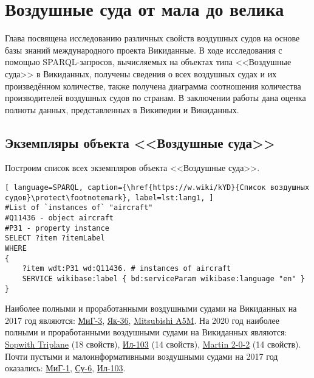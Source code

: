 \chapter{Воздушные суда от мала до велика}%
\label{ch:aircraft-chapter}

Глава посвящена исследованию различных свойств воздушных судов 
на основе базы знаний международного проекта Викиданные. 
В ходе исследования с помощью SPARQL-запросов, вычисляемых на объектах типа <<Воздушные суда>> в Викиданных, 
получены сведения о всех воздушных судах и их произведённом количестве, 
также получена диаграмма соотношения количества производителей воздушных судов по странам. 
В заключении работы дана оценка полноты данных, представленных в Википедии и Викиданных.

\section{Экземпляры объекта <<Воздушные суда>>}

Построим список всех экземпляров объекта <<Воздушные суда>>.


\begin{lstlisting}[ language=SPARQL, caption={\href{https://w.wiki/kYD}{Список воздушных судов}\protect\footnotemark}, label=lst:lang1, ]
#List of `instances of` "aircraft"
#Q11436 - object aircraft
#P31 - property instance
SELECT ?item ?itemLabel
WHERE
{
    ?item wdt:P31 wd:Q11436. # instances of aircraft
    SERVICE wikibase:label { bd:serviceParam wikibase:language "en" }
}
\end{lstlisting}


Наиболее полными и проработанными воздушными судами на Викиданных на 2017 год являются: \href{https://www.wikidata.org/wiki/Q271446}{МиГ-3}, \href{https://www.wikidata.org/wiki/Q1349098}{Як-36}, \href{https://www.wikidata.org/wiki/Q429839}{Mitsubishi A5M}. На 2020 год наиболее полными и проработанными воздушными судами на Викиданных являются: \href{https://www.wikidata.org/wiki/Q770863}{Sopwith Triplane} (18 свойств), \href{https://www.wikidata.org/wiki/Q1658673}{Ил-103} (14 свойств), \href{https://www.wikidata.org/wiki/Q665071}{Martin 2-0-2} (14 свойств).
Почти пустыми и малоинформативными воздушными судами на 2017 год оказались: \href{https://www.wikidata.org/wiki/Q464247}{МиГ-1}, \href{https://www.wikidata.org/wiki/Q2296502}{Су-6}, \href{https://www.wikidata.org/wiki/Q1658673}{Ил-103}.

